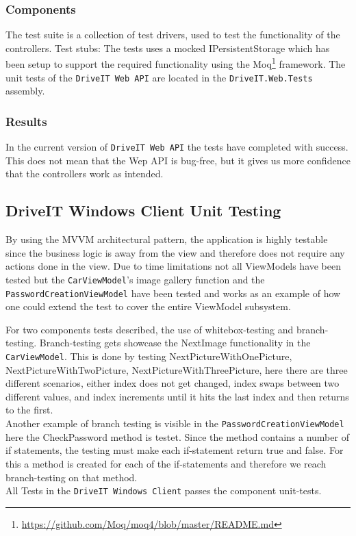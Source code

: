 \subsubsection{Components}
The test suite is a collection of test drivers, used to test the functionality of the controllers.
Test stubs: The tests uses a mocked IPersistentStorage which has been setup to support the required functionality using the Moq\footnote{\url{https://github.com/Moq/moq4/blob/master/README.md}} framework.
The unit tests of the \texttt{DriveIT Web API} are located in the \texttt{DriveIT.Web.Tests} assembly.

\subsubsection{Results}
In the current version of \texttt{DriveIT Web API} the tests have completed with success. This does not mean that the Wep API is bug-free, but it gives us more confidence that the controllers work as intended.

\subsection{DriveIT Windows Client Unit Testing}
By using the MVVM architectural pattern, the application is highly testable since the business logic is away from the view and therefore does not require any actions done in the view. Due to time limitations not all ViewModels have been tested but the \texttt{CarViewModel}'s image gallery function and the \texttt{PasswordCreationViewModel} have been tested and works as an example of how one could extend the test to cover the entire ViewModel subsystem.

For two components tests described, the use of whitebox-testing and branch-testing. Branch-testing gets showcase the NextImage functionality in the \texttt{CarViewModel}. This is done by testing NextPictureWithOnePicture, NextPictureWithTwoPicture, NextPictureWithThreePicture, here there are three different scenarios, either index does not get changed, index swaps between two different values, and index increments until it hits the last index and then returns to the first. \\
Another example of branch testing is visible in the \texttt{PasswordCreationViewModel} here the CheckPassword method is testet. Since the method contains a number of if statements, the testing must make each if-statement return true and false. For this a method is created for each of the if-statements and therefore we reach branch-testing on that method.\\

All Tests in the \texttt{DriveIT Windows Client} passes the component unit-tests.
